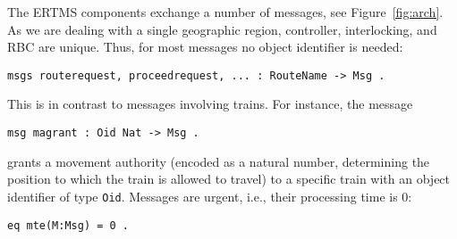 The ERTMS components exchange a number of messages, see Figure~\ref{fig:arch}. As we are dealing with a single geographic region,
controller, interlocking, and RBC are unique. Thus, for most messages
no object identifier is needed:
%
\begin{lstlisting}[columns=fixed]
msgs routerequest, proceedrequest, ... : RouteName -> Msg .
\end{lstlisting}
This is in contrast to messages involving trains. For instance, the message 
\begin{lstlisting}[columns=fixed]
msg magrant : Oid Nat -> Msg .
\end{lstlisting}
grants a movement authority (encoded as a natural number, determining
the position to which the train is allowed to travel) to a specific
train with an object identifier of type \verb|Oid|.
%
Messages are urgent, i.e., their processing time is 0:
\begin{lstlisting}[columns=fixed]
eq mte(M:Msg) = 0 .
\end{lstlisting}
